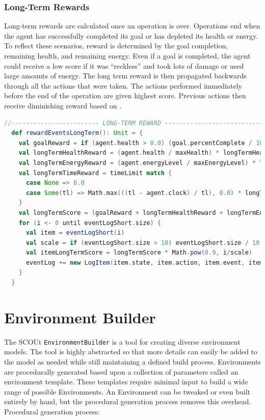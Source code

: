 \subsubsection{Long-Term Rewards}
Long-term rewards are calculated once an operation is over.
Operations end when the agent has successfully completed its goal or has depleted its health or energy.
To reflect these scenarios, reward is determined by the goal completion, remaining health, and remaining energy.
Even if a goal is completed, the agent could receive a low score if it was ``reckless'' and took lots of damage or used large amounts of energy.
The long term reward is then propagated backwards through all the actions that were taken.
The actions performed immediately before the end of the operation are given highest score.
Previous actions then receive diminishing reward based on .

\begin{lstlisting}[language=Scala, label=code:long_term_reward]
  //------------------------ LONG-TERM REWARD ---------------------------------
  def rewardEventsLongTerm(): Unit = {
    val goalReward = if (agent.health > 0.0) (goal.percentComplete / 100.0) * goalRewardWeight else 0.0
    val longTermHealthReward = (agent.health / maxHealth) * longTermHealthRewardWeight
    val longTermEnergyReward = (agent.energyLevel / maxEnergyLevel) * longTermEnergyRewardWeight
    val longTermTimeReward = timeLimit match {
      case None => 0.0
      case Some(tl) => Math.max(((tl - agent.clock) / tl), 0.0) * longTermTimeRewardWeight
    }
    val longTermScore = (goalReward + longTermHealthReward + longTermEnergyReward + longTermTimeReward) / longTermWeightsTotal
    for (i <- 0 until eventLogShort.size) {
      val item = eventLogShort(i)
      val scale = if (eventLogShort.size > 10) eventLogShort.size / 10 else 1.0
      val itemLongTermScore = longTermScore * Math.pow(0.9, i/scale)
      eventLog += new LogItem(item.state, item.action, item.event, item.shortTermScore, longTermScore)
    }
  }
\end{lstlisting}


\section{Environment Builder} \label{sec:environment_builder}
The SCOUt \texttt{EnvironmentBuilder} is a tool for creating diverse environment models.
The tool is highly abstracted so that more details can easily be added to the model as needed while still maintaining a defined build process.
Environments are procedurally generated based upon a collection of parameters called an environment template.
These templates require minimal input to build a wide range of possible Environments.
An Environment can be tweaked or even built entirely by hand, but the procedural generation process removes this overhead.
Procedural generation process:

